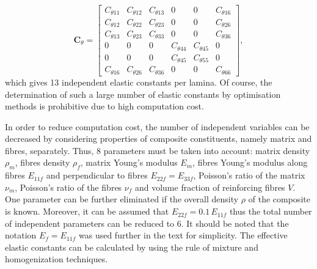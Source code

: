 \documentclass[preprint,12pt]{elsarticle}
\newcommand{\matr}[1]{\mathbf{#1}} %
\begin{document}
 \begin{equation}
 \matr{C}_{\theta} = \left[\begin{array}{cccccc} C_{\theta 11} & C_{\theta 12}& C_{\theta 13} & 0&0&C_{\theta 16}\\[2pt]
 C_{\theta 12}& C_{\theta 22} & C_{\theta 23}& 0 &0&C_{\theta 26}\\[2pt]
 C_{\theta 13}&C_{\theta 23}&C_{\theta 33}&0&0&C_{\theta 36}\\[2pt]
 0& 0&0&C_{\theta 44}& C_{\theta 45}&0\\[2pt]
 0&0&0&C_{\theta 45}&C_{\theta 55}&0\\[2pt]
 C_{\theta 16}&C_{\theta 26} &C_{\theta 36}&0&0&C_{\theta 66}
 \end{array}\right], 
 \label{eq:elastic_constatns_theta}
 \end{equation} 
 which gives 13 independent elastic constants per lamina. Of course, the determination of such a large number of elastic constants by optimisation methods is prohibitive due to high computation cost. 
 
 In order to reduce computation cost, the number of independent variables can be 
 decreased by considering properties of composite constituents, namely matrix and 
 fibres, separately. Thus,  8 parameters must be taken into account: matrix density 
 \(\rho_m\), fibres density \(\rho_f\), matrix Young's modulus \(E_m\), fibres Young's 
 modulus along fibres \(E_{11f}\) and perpendicular to fibres \(E_{22f}=E_{33f}\), 
 Poisson's ratio of the matrix \(\nu_m\), Poisson's ratio of the fibres \(\nu_f\) and volume 
 fraction of reinforcing fibres \(V\). One parameter can be further eliminated if the 
 overall 
 density \(\rho\) of the composite is known. Moreover, it can be assumed that \(E_{22f} 
 = 
 0.1\, E_{11f}\) thus the total number of independent parameters can be reduced to 6. It 
 should be noted that the notation \(E_f = E_{11f}\) was used further in the text for 
 simplicity. The effective elastic constants can be calculated by using the rule of 
 mixture and homogenization techniques.
\end{document}
